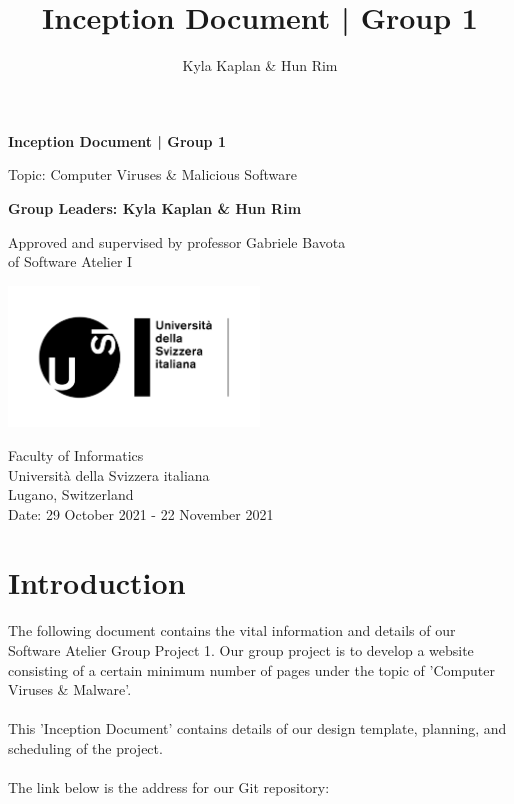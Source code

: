 \documentclass[a4paper,10pt]{article}
\title{Inception Document | Group 1}
\author{Kyla Kaplan & Hun Rim}
\begin{document}
\begin{titlepage}
   \begin{center}
       \vspace*{1cm}

       \textbf{Inception Document | Group 1}

       \vspace{0.5cm}
        Topic: Computer Viruses \& Malicious Software
            
       \vspace{1.5cm}

       \textbf{Group Leaders: Kyla Kaplan \& Hun Rim}

       \vfill
            
       Approved and supervised by professor Gabriele Bavota\\
       of Software Atelier I
            
       \vspace{0.8cm}
     
       \includegraphics[width=0.5\textwidth]{press-logo-statico-usi-orizzontale-web.png}
       
       \vspace{0.8cm}
       
       Faculty of Informatics\\
       Universit\`a della Svizzera italiana\\
       Lugano, Switzerland\\
       Date: 29 October 2021 - 22 November 2021
            
   \end{center}
\end{titlepage}

\newpage
\tableofcontents
\newpage
\section{Introduction}
The following document contains the vital information and details of our Software Atelier Group Project 1. Our group project is to develop a website consisting of a certain minimum number of pages under the topic of 'Computer Viruses \& Malware'.\\\\This 'Inception Document' contains details of our design template, planning, and scheduling of the project.\\\\The link below is the address for our Git repository:
\end{document}
